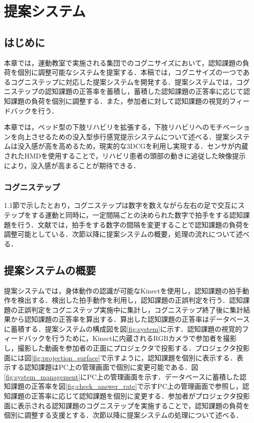 \chapter{提案システム}

\thispagestyle{myheadings}

\section{はじめに}
本章では，運動教室で実施される集団でのコグニサイズにおいて，認知課題の負荷を個別に調整可能なシステムを提案する．本稿では，コグニサイズの一つであるコグニステップに対応した提案システムを開発する．提案システムでは，コグニステップの認知課題の正答率を蓄積し，蓄積した認知課題の正答率に応じて認知課題の負荷を個別に調整する．また，参加者に対して認知課題の視覚的フィードバックを行う．

本章では，ベッド型の下肢リハビリを拡張する，下肢リハビリへのモチベーションを向上させるための没入型歩行感覚提示システムについて述べる．提案システムは没入感が高を高めるため，現実的な3DCGを利用し実現する．センサが内蔵されたHMDを使用することで，リハビリ患者の頭部の動きに追従した映像提示により，没入感が高まることが期待できる．
\fi

\subsection{コグニステップ}
1.1節で示したとおり，コグニステップは数字を数えながら左右の足で交互にステップをする運動と同時に，一定間隔ごとの決められた数字で拍手をする認知課題を行う．文献\cite{認知症予防へ向けた運動コグニサイズ}では，拍手をする数字の間隔を変更することで認知課題の負荷を調整可能としている．次節以降に提案システムの概要，処理の流れについて述べる．

\section{提案システムの概要}
提案システムでは，身体動作の認識が可能なKinectを使用し，認知課題の拍手動作を検出する．検出した拍手動作を利用し，認知課題の正誤判定を行う．認知課題の正誤判定をコグニステップ実施中に集計し，コグニステップ終了後に集計結果から認知課題の正答率を算出する．算出した認知課題の正答率はデータベースに蓄積する．提案システムの構成図を図\ref{fig:system}に示す．認知課題の視覚的フィードバックを行うために，Kinectに内蔵されるRGBカメラで参加者を撮影し，撮影した動画を参加者の正面にプロジェクタで投影する．プロジェクタ投影面には図\ref{fig:projection_surface}で示すように，認知課題を個別に表示する．表示する認知課題はPC上の管理画面で個別に変更可能である．図\ref{fig:system_management}にPC上の管理画面を示す．データベースに蓄積した認知課題の正答率を図\ref{fig:check_answer_rate}で示すPC上の管理画面で参照し，認知課題の正答率に応じて認知課題を個別に変更する．参加者がプロジェクタ投影面に表示される認知課題のコグニステップを実施することで，認知課題の負荷を個別に調整する支援とする．次節以降に提案システムの処理について述べる．


